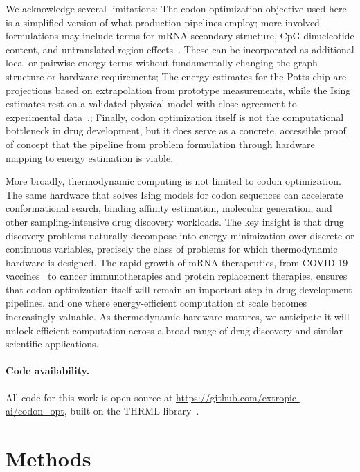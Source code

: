 \documentclass[11pt,twocolumn]{article}
\begin{document}
We acknowledge several limitations:
The codon optimization objective used here is a simplified version of what production pipelines employ; more involved formulations may include terms for mRNA secondary structure, CpG dinucleotide content, and untranslated region effects~\cite{fox2021mrna}.
These can be incorporated as additional local or pairwise energy terms without fundamentally changing the graph structure or hardware requirements;
The energy estimates for the Potts chip are projections based on extrapolation from prototype measurements, while the Ising estimates rest on a validated physical model with close agreement to experimental data~\cite{jelincic2025dtm}.;
Finally, codon optimization itself is not the computational bottleneck in drug development, but it does serve as a concrete, accessible proof of concept that the pipeline from problem formulation through hardware mapping to energy estimation is viable.

More broadly, thermodynamic computing is not limited to codon optimization.
The same hardware that solves Ising models for codon sequences can accelerate conformational search, binding affinity estimation, molecular generation, and other sampling-intensive drug discovery workloads.
The key insight is that drug discovery problems naturally decompose into energy minimization over discrete or continuous variables, precisely the class of problems for which thermodynamic hardware is designed.
The rapid growth of mRNA therapeutics, from COVID-19 vaccines~\cite{polack2020mrna} to cancer immunotherapies and protein replacement therapies, ensures that codon optimization itself will remain an important step in drug development pipelines, and one where energy-efficient computation at scale becomes increasingly valuable.
As thermodynamic hardware matures, we anticipate it will unlock efficient computation across a broad range of drug discovery and similar scientific applications.

\paragraph{Code availability.}
All code for this work is open-source at \url{https://github.com/extropic-ai/codon_opt}, built on the THRML library~\cite{jelincic2025dtm}.

\section{Methods}
\end{document}
